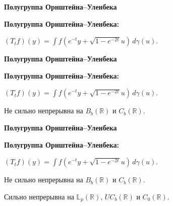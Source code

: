 \documentclass[11pt]{article}
\newcommand{\R}{\mathbb{R}}
\newcommand{\Lp}{\mathbb{L}}
\begin{document}
\newpage

\begin{center}
{\color{notaeYELLOW}\bfseries\fontsize{44}{52}\selectfont Полугруппа Орнштейна--Уленбека}
\end{center}
\vspace*{\fill}
\begin{center}
\fontsize{36}{43}\selectfont
\parbox{\linewidth}{\centering\noindent \textbf{Полугруппа Орнштейна--Уленбека:}
\par}\vspace{0.4in}
\parbox{\linewidth}{\centering\noindent $(T_t f)(y)=\int f(e^{-t}y+\sqrt{1-e^{-2t}}u)\,d\gamma(u).$
\par}\vspace{0.4in}
\end{center}
\vspace*{\fill}

\newpage

\begin{center}
{\color{notaeYELLOW}\bfseries\fontsize{44}{52}\selectfont Полугруппа Орнштейна--Уленбека}
\end{center}
\vspace*{\fill}
\begin{center}
\fontsize{36}{43}\selectfont
\parbox{\linewidth}{\centering\noindent \textbf{Полугруппа Орнштейна--Уленбека:}
\par}\vspace{0.4in}
\parbox{\linewidth}{\centering\noindent $(T_t f)(y)=\int f(e^{-t}y+\sqrt{1-e^{-2t}}u)\,d\gamma(u).$
\par}\vspace{0.4in}
\parbox{\linewidth}{\centering\noindent Не сильно непрерывна на $B_b(\R)$ и $C_b(\R)$.
\par}\vspace{0.4in}
\end{center}
\vspace*{\fill}

\newpage

\begin{center}
{\color{notaeYELLOW}\bfseries\fontsize{44}{52}\selectfont Полугруппа Орнштейна--Уленбека}
\end{center}
\vspace*{\fill}
\begin{center}
\fontsize{36}{43}\selectfont
\parbox{\linewidth}{\centering\noindent \textbf{Полугруппа Орнштейна--Уленбека:}
\par}\vspace{0.4in}
\parbox{\linewidth}{\centering\noindent $(T_t f)(y)=\int f(e^{-t}y+\sqrt{1-e^{-2t}}u)\,d\gamma(u).$
\par}\vspace{0.4in}
\parbox{\linewidth}{\centering\noindent Не сильно непрерывна на $B_b(\R)$ и $C_b(\R)$.
\par}\vspace{0.4in}
\parbox{\linewidth}{\centering\noindent Сильно непрерывна на $\Lp_p(\R)$, $UC_b(\R)$ и $C_0(\R)$.
\par}\vspace{0.4in}
\end{center}
\vspace*{\fill}
\end{document}

